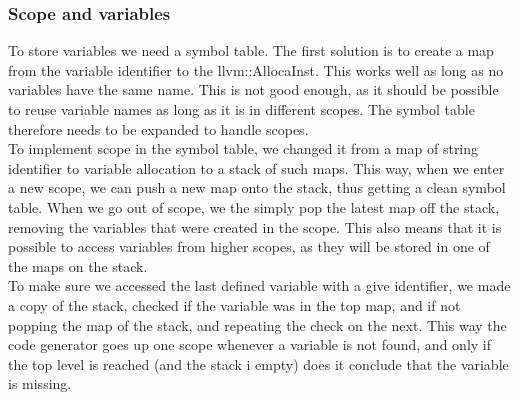 \subsubsection{Scope and variables}
To store variables we need a symbol table. The first solution is to create a map from the variable identifier to the llvm::AllocaInst. This works well as long as no variables have the same name. This is not good enough, as it should be possible to reuse variable names as long as it is in different scopes. The symbol table therefore needs to be expanded to handle scopes.\\
To implement scope in the symbol table, we changed it from a map of string identifier to variable allocation to a stack of such maps. This way, when we enter a new scope, we can push a new map onto the stack, thus getting a clean symbol table. When we go out of scope, we the simply pop the latest map off the stack, removing the variables that were created in the scope. This also means that it is possible to access variables from higher scopes, as they will be stored in one of the maps on the stack.\\
To make sure we accessed the last defined variable with a give identifier, we made a copy of the stack, checked if the variable was in the top map, and if not popping the map of the stack, and repeating the check on the next. This way the code generator goes up one scope whenever a variable is not found, and only if the top level is reached (and the stack i empty) does it conclude that the variable is missing.

